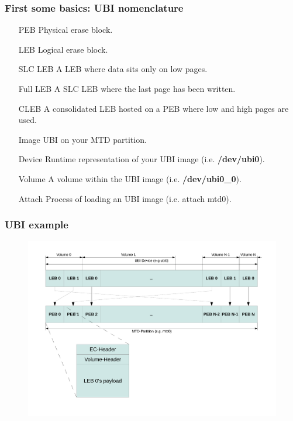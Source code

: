 \documentclass[aspectratio=169,obeyspaces,spaces,hyphens,dvipsnames]{beamer}
\begin{document}
\begin{frame}[fragile]
\frametitle{First some basics: UBI nomenclature}
\begin{itemize}
\item[PEB] Physical erase block.
\item[LEB] Logical erase block.
\item[SLC LEB] A LEB where data sits only on low pages.
\item[Full LEB] A SLC LEB where the last page has been written.
\item[CLEB] A consolidated LEB hosted on a PEB where low and high pages are used.
\item[Image] UBI on your MTD partition.
\item[Device] Runtime representation of your UBI image (i.e. \textbf{/dev/ubi0}).
\item[Volume] A volume within the UBI image (i.e. \textbf{/dev/ubi0\_0}).
\item[Attach] Process of loading an UBI image (i.e. attach mtd0).
\end{itemize}
\end{frame}

\begin{frame}[fragile]
\frametitle{UBI example}
\begin{figure}
\includegraphics[scale=0.33]{ubi-nonfastmap.pdf}
\end{figure}
\end{frame}
\end{document}
